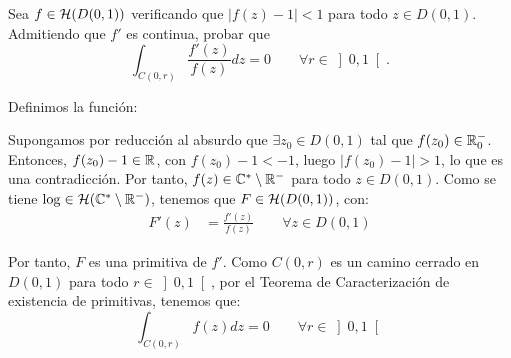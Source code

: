 \begin{ejercicio}
    Sea $f \in \mathcal{H}(D(0,1))$ verificando que $|f(z)-1| < 1$ para todo $z \in D(0,1)$. Admitiendo que $f'$ es continua, probar que
    \[
        \int_{C(0,r)} \frac{f'(z)}{f(z)}dz = 0\qquad \forall r \in \left]0,1\right[.
    \]

    Definimos la función:

    Supongamos por reducción al absurdo que $\exists z_0 \in D(0,1)$ tal que $f(z_0)\in \mathbb{R}_0^-$. Entonces, $f(z_0)-1\in \mathbb{R}$, con $f(z_0)-1<-1$, luego $|f(z_0)-1|>1$, lo que es una contradicción. Por tanto, $f(z)\in \mathbb{C}^\ast\setminus \mathbb{R}^-$ para todo $z \in D(0,1)$. Como se tiene $\log\in \mathcal{H}(\mathbb{C}^\ast\setminus \mathbb{R}^-)$, tenemos que $F\in \mathcal{H}(D(0,1))$, con:
    \begin{align*}
        F'(z) &= \frac{f'(z)}{f(z)}\qquad \forall z \in D(0,1)
    \end{align*}

    Por tanto, $F$ es una primitiva de $f'$. Como $C(0,r)$ es un camino cerrado en $D(0,1)$ para todo $r \in \left]0,1\right[$, por el Teorema de Caracterización de existencia de primitivas, tenemos que:
    \begin{equation*}
        \int_{C(0,r)} f(z)dz = 0\qquad \forall r \in \left]0,1\right[
    \end{equation*}
\end{ejercicio}


